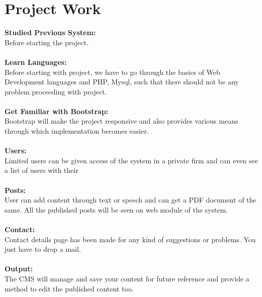 \section{Project Work} 
\textbf{Studied Previous System:}\\
Before starting the project. \\\\
\textbf{Learn Languages:}\\
Before starting with project, we have to go through the basics of Web Development languages and PHP, Mysql, such that there should not be any problem proceeding with project.\\\\
\textbf{Get Familiar with Bootstrap:}\\
Bootstrap will make the project responsive and also provides various means through which implementation becomes easier.\\\\
\textbf{Users:}\\
Limited users can be given access of the system in a private firm and can even see a list of users with their\\\\
\textbf{Posts:}\\
User can add content through text or speech and can get a PDF document of the same. All the published posts will be seen on web module of the system.\\\\
\textbf{Contact:}\\
Contact details page has been made for any kind of suggestions or problems. You just have to drop a mail.\\\\
\textbf{Output:}\\
The CMS will manage and save your content for future reference and provide a method to edit the published content too.
